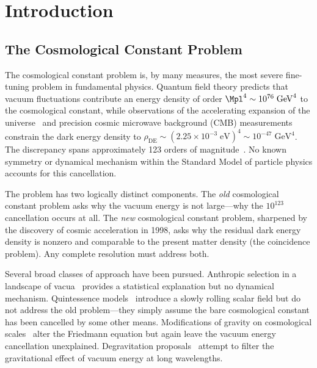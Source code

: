 \section{Introduction}
\label{sec:1-intro}

\subsection{The Cosmological Constant Problem}
\label{sec:1-cc-problem}

The cosmological constant problem is, by many measures, the most severe fine-tuning problem in fundamental physics. Quantum field theory predicts that vacuum fluctuations contribute an energy density of order $\Mpl^4 \sim 10^{76}\;\mathrm{GeV}^4$ to the cosmological constant, while observations of the accelerating expansion of the universe~\cite{ch1:riess98,ch1:perlmutter99} and precision cosmic microwave background (CMB) measurements~\cite{ch1:planck18} constrain the dark energy density to $\rho_{\mathrm{DE}} \sim (2.25 \times 10^{-3}\;\mathrm{eV})^4 \sim 10^{-47}\;\mathrm{GeV}^4$. The discrepancy spans approximately 123 orders of magnitude~\cite{ch1:weinberg89,ch1:martin12}. No known symmetry or dynamical mechanism within the Standard Model of particle physics accounts for this cancellation.

The problem has two logically distinct components. The \emph{old} cosmological constant problem asks why the vacuum energy is not large---why the $10^{123}$ cancellation occurs at all. The \emph{new} cosmological constant problem, sharpened by the discovery of cosmic acceleration in 1998, asks why the residual dark energy density is nonzero and comparable to the present matter density (the coincidence problem). Any complete resolution must address both.

Several broad classes of approach have been pursued. Anthropic selection in a landscape of vacua~\cite{ch1:weinberg87} provides a statistical explanation but no dynamical mechanism. Quintessence models~\cite{ch1:ratra88,ch1:copeland06} introduce a slowly rolling scalar field but do not address the old problem---they simply assume the bare cosmological constant has been cancelled by some other means. Modifications of gravity on cosmological scales~\cite{ch1:clifton12,ch1:nojiri17} alter the Friedmann equation but again leave the vacuum energy cancellation unexplained. Degravitation proposals~\cite{ch1:dvali07} attempt to filter the gravitational effect of vacuum energy at long wavelengths.

